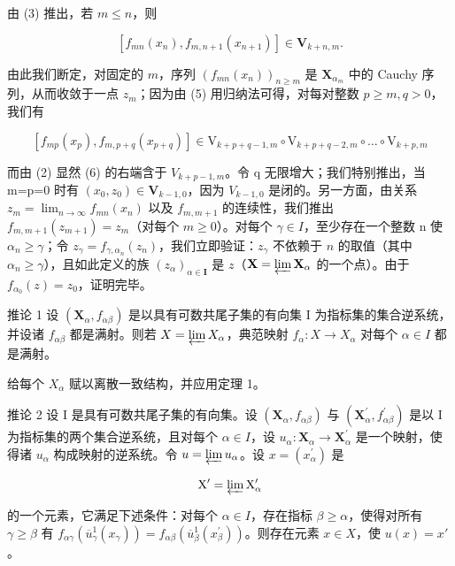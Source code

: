 由 (3) 推出，若 \(m \leqslant n\)，则

\[
\left[ f _ {m n} (x _ {n}), f _ {m, n + 1} (x _ {n + 1}) \right] \in \mathbf {V} _ {k + n, m}.\tag{5}
\]

由此我们断定，对固定的 \(m\)，序列 \((f_{mn}(x_n))_{n\geqslant m}\) 是 \(\mathbf{X}_{\alpha_m}\) 中的 Cauchy 序列，从而收敛于一点 \(z_m\)；因为由 (5) 用归纳法可得，对每对整数 \(p\geqslant m,q > 0\)，我们有

\[
\left[ f _ {m p} (x _ {p}), f _ {m, p + q} (x _ {p + q}) \right] \in \mathrm{V} _ {k + p + q - 1, m} \circ \mathrm{V} _ {k + p + q - 2, m} \circ \dots \circ \mathrm{V} _ {k + p, m}\tag{6}
\]

而由 (2) 显然 (6) 的右端含于 \(V_{k+p-1,m}\)。令 q 无限增大；我们特别推出，当 m=p=0 时有 \((x_{0},z_{0})\in\mathbf{V}_{k-1,0}\)，因为 \(V_{k-1,0}\) 是闭的。另一方面，由关系 \(z_{m}=\lim_{n\to\infty}f_{mn}(x_{n})\) 以及 \(f_{m,m+1}\) 的连续性，我们推出 \(f_{m,m+1}(z_{m+1})=z_{m}\)（对每个 \(m\geqslant0\)）。对每个 \(\gamma\in I\)，至少存在一个整数 n 使 \(\alpha_{n}\geqslant\gamma\)；令 \(z_{\gamma} = f_{\gamma, \alpha_n}(z_n)\)，我们立即验证：\(z_{\gamma}\) 不依赖于 \(n\) 的取值（其中 \(\alpha_n \geqslant \gamma\)），且如此定义的族 \((z_\alpha)_{\alpha \in \mathbf{I}}\) 是 \(z\)（\(\mathbf{X} = \varprojlim \mathbf{X}_\alpha\) 的一个点）。由于 \(f_{\alpha_0}(z) = z_0\)，证明完毕。

推论 1 设 \((\mathbf{X}_{\alpha}, f_{\alpha\beta})\) 是以具有可数共尾子集的有向集 I 为指标集的集合逆系统，并设诸 \(f_{\alpha\beta}\) 都是满射。则若 \(X = \varprojlim X_{\alpha}\)，典范映射 \(f_{\alpha}: X \to X_{\alpha}\) 对每个 \(\alpha \in I\) 都是满射。

给每个 \(X_{\alpha}\) 赋以离散一致结构，并应用定理 1。

推论 2 设 I 是具有可数共尾子集的有向集。设 \((\mathbf{X}_{\alpha}, f_{\alpha \beta})\) 与 \((\mathbf{X}_{\alpha}^{\prime}, f_{\alpha \beta}^{\prime})\) 是以 I 为指标集的两个集合逆系统，且对每个 \(\alpha \in I\)，设 \(u_{\alpha}: \mathbf{X}_{\alpha} \to \mathbf{X}_{\alpha}^{\prime}\) 是一个映射，使得诸 \(u_{\alpha}\) 构成映射的逆系统。令 \(u = \varprojlim u_{\alpha}\)。设 \(x = (x_{\alpha}^{\prime})\) 是

\[
\mathrm{X} ^ {\prime} = \varprojlim \mathrm{X} _ {\alpha} ^ {\prime}
\]

的一个元素，它满足下述条件：对每个 \(\alpha \in I\)，存在指标 \(\beta \geqslant \alpha\)，使得对所有 \(\gamma \geqslant \beta\) 有 \(f_{\alpha \gamma}(\overline{u}_{\gamma}^{1}(x_{\gamma})) = f_{\alpha \beta}(\overline{u}_{\beta}^{1}(x_{\beta}^{\prime}))\)。则存在元素 \(x \in X\)，使 \(u(x) = x'\)。

